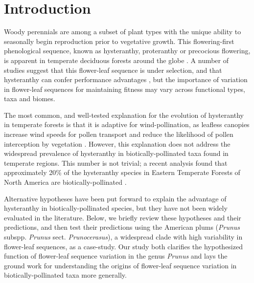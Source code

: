 \documentclass{article}[12pt]
\begin{document}
\section*{Introduction}
\noindent Woody perennials are among a subset of plant types with the unique ability to seasonally begin reproduction prior to vegetative growth. This flowering-first phenological sequence, known as hysteranthy, proteranthy or precocious flowering, is apparent in temperate deciduous forests around the globe \citep{Rathcke_1985}. A number of studies suggest that this flower-leaf sequence is under selection, and that hysteranthy can confer performance advantages \citep{Gougherty2018,Buonaiuto2020,Guo2014}, but the importance of variation in flower-leaf sequences for maintaining fitness may vary across functional types, taxa and biomes. %

\noindent The most common, and well-tested explanation for the evolution of hysteranthy in temperate forests is that it is adaptive for wind-pollination, as leafless canopies increase wind speeds for pollen transport and reduce the likelihood of pollen interception by vegetation \citep{Whitehead1969,Niklas1985}. However, this explanation does not address the widespread prevalence of hysteranthy in biotically-pollinated taxa found in temperate regions. This number is not trivial; a recent analysis found that approximately 20\% of the hysteranthy species in Eastern Temperate Forests of North America are biotically-pollinated \citep{Buonaiuto2020}. 

Alternative hypotheses have been put forward to explain the advantage of hysteranthy in biotically-pollinated species, but they have not been widely evaluated in the literature. Below, we briefly review these hypotheses and their predictions, and then test their predictions using the American plums (\textit{Prunus} subspp. \textit{Prunus} sect. \textit{Prunocerasus}), a widespread clade with high variability in flower-leaf sequences, as a case-study. Our study both clarifies the hypothesized function of flower-leaf sequence variation in the genus \emph{Prunus} and lays the ground work for understanding the origins of flower-leaf sequence variation in biotically-pollinated taxa more generally.
\end{document}
